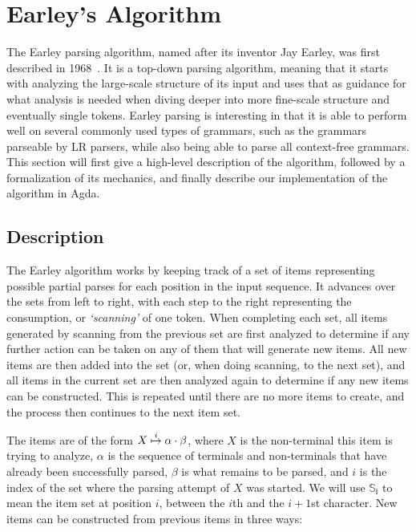 \chapter{Earley's Algorithm} \label{Earleys}

	The Earley parsing algorithm, named after its inventor Jay Earley, was
	first described in 1968~\cite{Earley}. It is a top-down parsing algorithm,
	meaning that it starts with analyzing the large-scale structure of its
	input and uses that as guidance for what analysis is needed when diving
	deeper into more fine-scale structure and eventually single tokens.  Earley
	parsing is interesting in that it is able to perform well on several
	commonly used types of grammars, such as the grammars parseable by LR
	parsers, while also being able to parse all context-free grammars. This
	section will first give a high-level description of the algorithm, followed
	by a formalization of its mechanics, and finally describe our
	implementation of the algorithm in Agda.

	\section{Description}

		The Earley algorithm works by keeping track of a set of items
		representing possible partial parses for each position in the input
		sequence. It advances over the sets from left to right, with each step
		to the right representing the consumption, or \emph{`scanning'} of one
		token. When completing each set, all items generated by scanning from
		the previous set are first analyzed to determine if any further action
		can be taken on any of them that will generate new items. All new items
		are then added into the set (or, when doing scanning, to the next set),
		and all items in the current set are then analyzed again to determine
		if any new items can be constructed. This is repeated until there are
		no more items to create, and the process then continues to the next
		item set.

		The items are of the form $X\overset{i}{\mapsto}\alpha\cdot\beta$, where $X$ is
		the non-terminal this item is trying to analyze, $\alpha$ is the
		sequence of terminals and non-terminals that have already been
		successfully parsed, $\beta$ is what remains to be parsed, and $i$ is
		the index of the set where the parsing attempt of $X$ was started. We
		will use $\mathbb{S_i}$ to mean the item set at position $i$, between
		the $i$th and the $i+1$st character. New items can be constructed from
		previous items in three ways:

